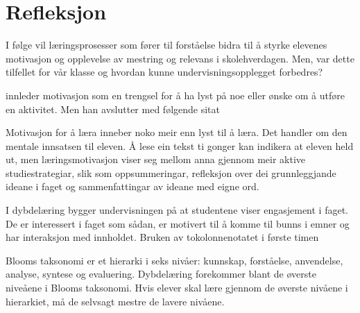 \documentclass[main.tex]{subfiles}
\begin{document}
\section*{Refleksjon}
\label{sec:3}

I følge  vil læringsprosesser som fører til forståelse bidra til å styrke elevenes motivasjon og 
opplevelse av mestring og relevans i skolehverdagen. Men, var dette tilfellet for vår klasse og hvordan
kunne undervisningsopplegget forbedres?

 innleder motivasjon som en trengsel for å ha lyst på noe eller ønske om å utføre en aktivitet.
Men han avslutter med følgende sitat
\begin{displayquote}
Motivasjon for å læra inneber noko meir enn lyst til å læra. Det handler om den mentale innsatsen til eleven.
Å lese ein tekst ti gonger kan indikera at eleven held ut, men læringsmotivasjon viser seg mellom anna gjennom
meir aktive studiestrategiar, slik som oppsummeringar, refleksjon over dei grunnleggjande ideane i faget og 
sammenfattingar av ideane med eigne ord.
\end{displayquote}
I dybdelæring bygger undervisningen på at studentene viser engasjement i faget. De er interessert i faget som sådan, er motivert til å komme til bunns i emner og har interaksjon med innholdet.
Bruken av tokolonnenotatet i første timen

Blooms taksonomi er et hierarki i seks nivåer: kunnskap, forståelse, anvendelse, analyse, syntese og evaluering. Dybdelæring forekommer blant de øverste niveåene
i Blooms taksonomi. Hvis elever skal lære gjennom de øverste nivåene i hierarkiet, må de selvsagt mestre de lavere nivåene.
\end{document}

